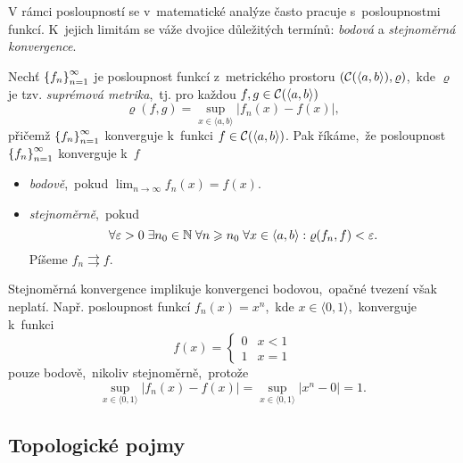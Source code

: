 V rámci posloupností se v~matematické analýze často pracuje s~posloupnostmi funkcí. K~jejich limitám se váže dvojice důležitých termínů: \emph{bodová} a \emph{stejnoměrná konvergence}.
\begin{definition}\label{def:bodova-stejnomerna-konvergence}
    Nechť $\left\{f_n\right\}_{n=1}^\infty$ je posloupnost funkcí z~metrického prostoru $(\mathcal{C}(\langle a,b\rangle),\varrho)$,~kde $\varrho$ je tzv. \emph{suprémová metrika},~tj. pro každou $f,g\in \mathcal{C}(\langle a,b\rangle)$
    \[\varrho(f,g)=\sup_{x\in\langle a,b\rangle}|f_n(x)-f(x)|,\]
    přičemž $\left\{f_n\right\}_{n=1}^\infty$ konverguje k~funkci $f\in \mathcal{C}(\langle a,b\rangle)$.
    Pak říkáme,~že posloupnost $\left\{f_n\right\}_{n=1}^\infty$ konverguje k~$f$
    \begin{itemize}
        \item \emph{bodově},~pokud $\lim_{n\to\infty}f_n(x)=f(x)$.
        \item \emph{stejnoměrně},~pokud
        \[\forall\varepsilon>0\;\exists n_0\in\mathbb{N}\;\forall n\geqslant n_0\;\forall x\in\langle a,b\rangle: \varrho(f_n,f)<\varepsilon.\]
        Píšeme $f_n\rightrightarrows f$.
    \end{itemize}
\end{definition}
Stejnoměrná konvergence implikuje konvergenci bodovou,~opačné tvezení však neplatí. Např. posloupnost funkcí $f_n(x)=x^n$,~kde $x\in\langle 0,1\rangle$,~konverguje k~funkci 
\[f(x)=\begin{cases}
    0 & x < 1\\
    1 & x = 1
\end{cases}\]
pouze bodově,~nikoliv stejnoměrně,~protože
\[\sup_{x\in\langle 0,1\rangle}|f_n(x)-f(x)|=\sup_{x\in\langle 0,1\rangle}|x^n-0|=1.\]

\subsection{Topologické pojmy}\label{subsec:topologicke-pojmy}

